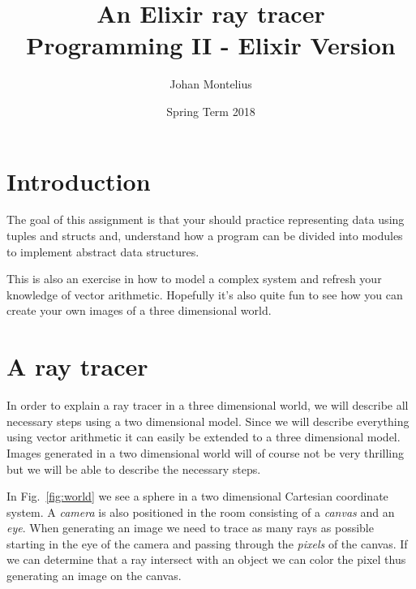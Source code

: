 \documentclass[a4paper,11pt]{article}
\begin{document}

\title{
    \textbf{An Elixir ray tracer}\\
    \large{Programming II - Elixir Version}
}
\author{Johan Montelius}
\date{Spring Term 2018}
\maketitle
\thispagestyle{fancy}



\section*{Introduction}

The goal of this assignment is that your should practice representing
data using tuples and structs and, understand how a program can be
divided into modules to implement abstract data structures.

This is also an exercise in how to model a complex system and refresh
your knowledge of vector arithmetic. Hopefully it's also quite fun to
see how you can create your own images of a three dimensional world.



\section{A ray tracer}

In order to explain a ray tracer in a three dimensional world, we will
describe all necessary steps using a two dimensional model. Since we
will describe everything using vector arithmetic it can easily be
extended to a three dimensional model. Images generated in a two
dimensional world will of course not be very thrilling but we will be able to describe the necessary steps.

In Fig.~\ref{fig:world} we see a sphere in a two dimensional Cartesian
coordinate system. A {\em camera} is also positioned in the room
consisting of a {\em canvas} and an {\em eye}. When generating an
image we need to trace as many rays as possible starting in the eye of
the camera and passing through the {\em pixels} of the canvas. If we
can determine that a ray intersect with an object we can color the
pixel thus generating an image on the canvas.
\end{document}
